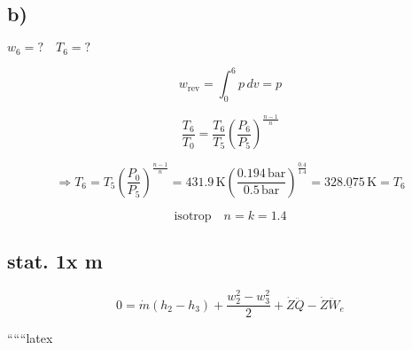 

\subsection*{b)}
$w_6 = ? \quad T_6 = ?$

\[
w_{\text{rev}} = \int_0^6 p \, dv = p
\]

\[
\frac{T_6}{T_0} = \frac{T_6}{T_5} \left( \frac{P_6}{P_5} \right)^{\frac{n-1}{n}}
\]

\[
\Rightarrow T_6 = T_5 \left( \frac{P_0}{P_5} \right)^{\frac{n-1}{n}} = 431.9 \, \text{K} \left( \frac{0.194 \, \text{bar}}{0.5 \, \text{bar}} \right)^{\frac{0.4}{1.4}} = \underline{328.075 \, \text{K}} = T_6
\]

\[
\text{isotrop} \quad n = k = 1.4
\]

\subsection*{stat. 1x m}
\[
0 = \dot{m} \left( h_2 - h_3 \right) + \frac{w_2^2 - w_3^2}{2} + \dot{Z} \ddot{Q} - \dot{Z} \ddot{W}_e
\]

``````latex